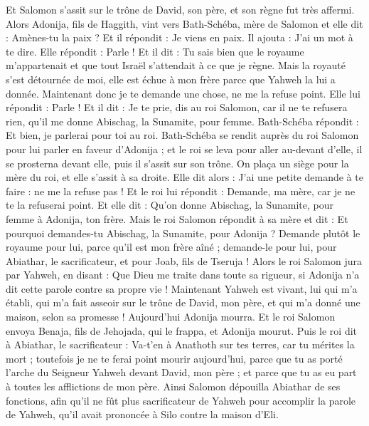 \begin{multicols}{2}
Et Salomon s'assit sur le trône de David, son père, et son règne fut très affermi.
Alors Adonija, fils de Haggith, vint vers Bath-Schéba, mère de Salomon et elle dit : Amènes-tu la paix ? Et il répondit : Je viens en paix.
Il ajouta : J'ai un mot à te dire. Elle répondit : Parle !
Et il dit : Tu sais bien que le royaume m'appartenait et que tout Israël s'attendait à ce que je règne. Mais la royauté s’est détournée de moi, elle est échue à mon frère parce que Yahweh la lui a donnée.
Maintenant donc je te demande une chose, ne me la refuse point. Elle lui répondit : Parle !
Et il dit : Je te prie, dis au roi Salomon, car il ne te refusera rien, qu'il me donne Abischag, la Sunamite, pour femme.
Bath-Schéba répondit : Et bien, je parlerai pour toi au roi.
Bath-Schéba se rendit auprès du roi Salomon pour lui parler en faveur d’Adonija ; et le roi se leva pour aller au-devant d’elle, il se prosterna devant elle, puis il s'assit sur son trône. On plaça un siège pour la mère du roi, et elle s'assit à sa droite.
Elle dit alors : J'ai une petite demande à te faire : ne me la refuse pas ! Et le roi lui répondit : Demande, ma mère, car je ne te la refuserai point.
Et elle dit : Qu'on donne Abischag, la Sunamite, pour femme à Adonija, ton frère.
Mais le roi Salomon répondit à sa mère et dit : Et pourquoi demandes-tu Abischag, la Sunamite, pour Adonija ? Demande plutôt le royaume pour lui, parce qu'il est mon frère aîné ; demande-le pour lui, pour Abiathar, le sacrificateur, et pour Joab, fils de Tseruja !
Alors le roi Salomon jura par Yahweh, en disant : Que Dieu me traite dans toute sa rigueur, si Adonija n'a dit cette parole contre sa propre vie !
Maintenant Yahweh est vivant, lui qui m'a établi, qui m'a fait asseoir sur le trône de David, mon père, et qui m'a donné une maison, selon sa promesse ! Aujourd’hui Adonija mourra.
Et le roi Salomon envoya Benaja, fils de Jehojada, qui le frappa, et Adonija mourut.
Puis le roi dit à Abiathar, le sacrificateur : Va-t'en à Anathoth sur tes terres, car tu mérites la mort ; toutefois je ne te ferai point mourir aujourd'hui, parce que tu as porté l'arche du Seigneur Yahweh devant David, mon père ; et parce que tu as eu part à toutes les afflictions de mon père.
Ainsi Salomon dépouilla Abiathar de ses fonctions, afin qu'il ne fût plus sacrificateur de Yahweh pour accomplir la parole de Yahweh, qu'il avait prononcée à Silo contre la maison d'Eli.

\end{multicols}

